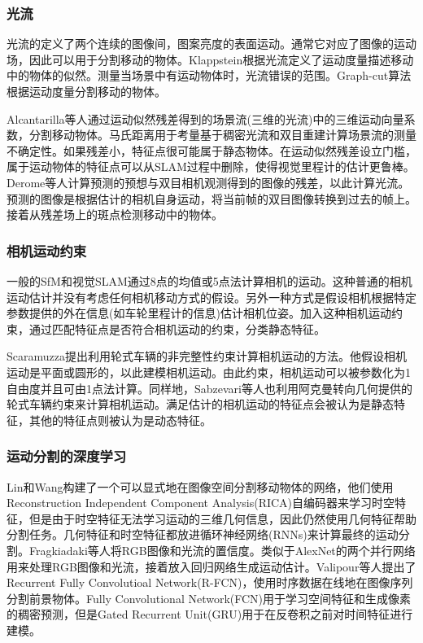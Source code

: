 \subsubsection{光流}
光流的定义了两个连续的图像间，图案亮度的表面运动\cite{Horn1980Determining}。通常它对应了图像的运动场，因此可以用于分割移动的物体。Klappstein\cite{Klappstein2008Moving}根据光流定义了运动度量描述移动中的物体的似然。测量当场景中有运动物体时，光流错误的范围。Graph-cut算法根据运动度量分割移动的物体。

Alcantarilla等人\cite{Alcantarilla2012On}通过运动似然残差得到的场景流(三维的光流)中的三维运动向量系数，分割移动物体。马氏距离用于考量基于稠密光流和双目重建计算场景流的测量不确定性。如果残差小，特征点很可能属于静态物体。在运动似然残差设立门槛，属于运动物体的特征点可以从SLAM过程中删除，使得视觉里程计的估计更鲁棒。Derome等人\cite{Derome2015Moving, Derome2014Real}计算预测的预想与双目相机观测得到的图像的残差，以此计算光流。预测的图像是根据估计的相机自身运动，将当前帧的双目图像转换到过去的帧上。接着从残差场上的斑点检测移动中的物体。

\subsubsection{相机运动约束}
一般的SfM和视觉SLAM通过8点的均值\cite{Longuet1981A}或5点法\cite{David2004An}计算相机的运动。这种普通的相机运动估计并没有考虑任何相机移动方式的假设。另外一种方式是假设相机根据特定参数提供的外在信息(如车轮里程计的信息)估计相机位姿。加入这种相机运动约束，通过匹配特征点是否符合相机运动的约束，分类静态特征。

Scaramuzza\cite{scaramuzza20111A}提出利用轮式车辆的非完整性约束计算相机运动的方法。他假设相机运动是平面或圆形的，以此建模相机运动。由此约束，相机运动可以被参数化为1自由度并且可由1点法计算\cite{scaramuzza2009realA}。同样地，Sabzevari等人\cite{sabzevari2016multiA}也利用阿克曼转向几何提供的轮式车辆约束来计算相机运动。满足估计的相机运动的特征点会被认为是静态特征，其他的特征点则被认为是动态特征。

\subsubsection{运动分割的深度学习}
Lin和Wang\cite{Lin2014Deep}构建了一个可以显式地在图像空间分割移动物体的网络，他们使用Reconstruction Independent Component Analysis(RICA)自编码器\cite{NIPS2011_4467,Le2013Building}来学习时空特征，但是由于时空特征无法学习运动的三维几何信息，因此仍然使用几何特征帮助分割任务。几何特征和时空特征都放进循环神经网络(RNNs)来计算最终的运动分割。Fragkiadaki等人\cite{Fragkiadaki2015Learning}将RGB图像和光流的置信度。类似于AlexNet\cite{Krizhevsky2012ImageNet}的两个并行网络用来处理RGB图像和光流，接着放入回归网络生成运动估计。Valipour等人\cite{Valipour2017Recurrent}提出了Recurrent Fully Convolutioal Network(R-FCN)，使用时序数据在线地在图像序列分割前景物体。Fully Convolutional Network(FCN)\cite{2014arXiv1411}用于学习空间特征和生成像素的稠密预测，但是Gated Recurrent Unit(GRU)用于在反卷积之前对时间特征进行建模。

